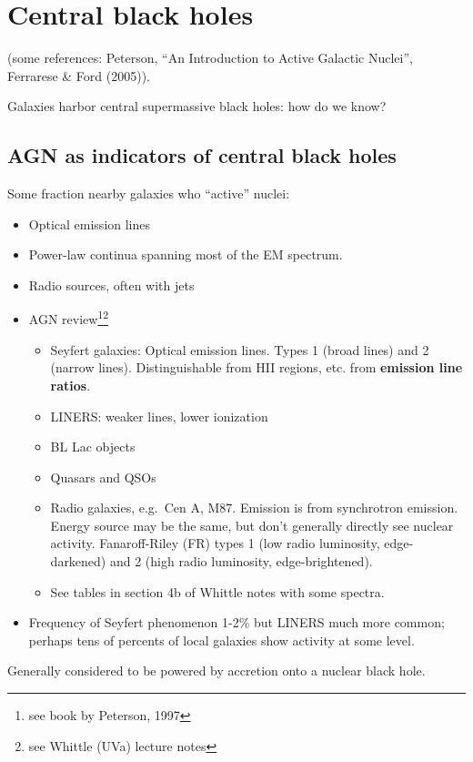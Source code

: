 \documentclass{article}
\begin{document}
\newpage
\section{Central black holes}
(some references: Peterson, ``An Introduction to Active Galactic Nuclei'',
Ferrarese \& Ford (2005)).

Galaxies harbor central supermassive black holes: how do we know?
\subsection{AGN as indicators of central black holes}
Some fraction nearby galaxies who ``active'' nuclei:
\begin{itemize}
    \item Optical emission lines
    \item Power-law continua spanning most of the EM spectrum.
    \item Radio sources, often with jets
    \item AGN review\footnote{see book by Peterson, 1997}\footnote{see
        Whittle (UVa) lecture notes}
        \begin{itemize}
            \item Seyfert galaxies: Optical emission lines. Types 1
                (broad lines) and 2 (narrow lines). Distinguishable from
                HII regions, etc. from \textbf{emission line ratios}.
            \item LINERS: weaker lines, lower ionization
            \item BL Lac objects
            \item Quasars and QSOs
            \item Radio galaxies, e.g.\ Cen A, M87. Emission is from
                synchrotron emission. Energy source may be the same,
                but don't generally directly see nuclear activity.
                Fanaroff-Riley (FR) types 1 (low radio luminosity,
                edge-darkened) and 2 (high radio luminosity, edge-brightened).
            \item See tables in section 4b of Whittle notes with some spectra.
        \end{itemize}
    \item Frequency of Seyfert phenomenon 1-2\% but LINERS much more common;
        perhaps tens of percents of local galaxies show activity at some
        level.
\end{itemize}
Generally considered to be powered by accretion onto a nuclear black hole.
\end{document}
